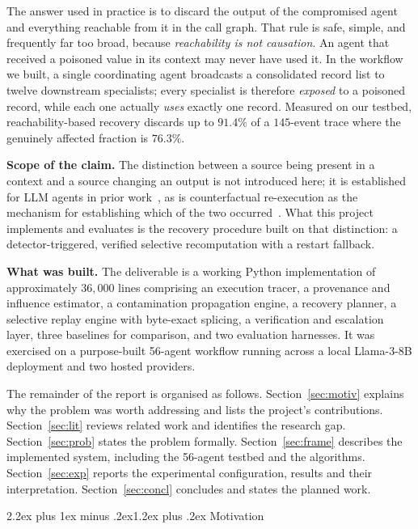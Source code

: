 \documentclass[10pt,twocolumn,a4paper]{article}
\makeatletter
\renewcommand{\section}{\@startsection{section}{1}{\z@}%
  {2.2ex plus 1ex minus .2ex}{1.2ex plus .2ex}%
  {\centering\normalfont\normalsize\scshape}}
\makeatother
\begin{document}
The answer used in practice is to discard the output of the compromised agent
and everything reachable from it in the call graph. That rule is safe, simple,
and frequently far too broad, because \emph{reachability is not causation}. An
agent that received a poisoned value in its context may never have used it. In
the workflow we built, a single coordinating agent broadcasts a consolidated
record list to twelve downstream specialists; every specialist is therefore
\emph{exposed} to a poisoned record, while each one actually \emph{uses}
exactly one record. Measured on our testbed, reachability-based recovery
discards up to $91.4\%$ of a $145$-event trace where the genuinely affected
fraction is $76.3\%$.

\textbf{Scope of the claim.} The distinction between a source being present in
a context and a source changing an output is not introduced
here; it is established for LLM agents in prior
work~\cite{neurotaint2026,granularity2026}, as is counterfactual re-execution
as the mechanism for establishing which of the two
occurred~\cite{car2026,causalflow2026}. What this project implements and
evaluates is the recovery procedure built on that distinction: a
detector-triggered, verified selective recomputation with a restart fallback.

\textbf{What was built.} The deliverable is a working Python implementation of
approximately $36{,}000$ lines comprising an execution tracer, a provenance
and influence estimator, a contamination propagation engine, a recovery
planner, a selective replay engine with byte-exact splicing, a verification and
escalation layer, three baselines for comparison, and two evaluation harnesses.
It was exercised on a purpose-built 56-agent workflow running across a local
Llama-3-8B deployment and two hosted providers.

The remainder of the report is organised as follows. Section~\ref{sec:motiv}
explains why the problem was worth addressing and lists the project's
contributions. Section~\ref{sec:lit} reviews related work and identifies the
research gap. Section~\ref{sec:prob} states the problem formally.
Section~\ref{sec:frame} describes the implemented system, including the
56-agent testbed and the algorithms. Section~\ref{sec:exp} reports the
experimental configuration, results and their interpretation.
Section~\ref{sec:concl} concludes and states the planned work.

\section{Motivation}
\label{sec:motiv}
\end{document}
